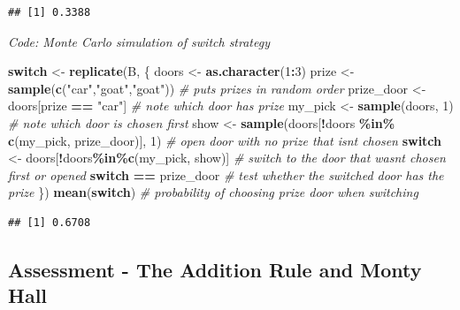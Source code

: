 \documentclass[
]{article}
\newenvironment{Shaded}{\begin{snugshade}}{\end{snugshade}}
\newcommand{\CommentTok}[1]{\textcolor[rgb]{0.56,0.35,0.01}{\textit{#1}}}
\newcommand{\ControlFlowTok}[1]{\textcolor[rgb]{0.13,0.29,0.53}{\textbf{#1}}}
\newcommand{\DecValTok}[1]{\textcolor[rgb]{0.00,0.00,0.81}{#1}}
\newcommand{\KeywordTok}[1]{\textcolor[rgb]{0.13,0.29,0.53}{\textbf{#1}}}
\newcommand{\NormalTok}[1]{#1}
\newcommand{\OperatorTok}[1]{\textcolor[rgb]{0.81,0.36,0.00}{\textbf{#1}}}
\newcommand{\StringTok}[1]{\textcolor[rgb]{0.31,0.60,0.02}{#1}}
\begin{document}
\begin{verbatim}
## [1] 0.3388
\end{verbatim}

\emph{Code: Monte Carlo simulation of switch strategy}

\begin{Shaded}
\begin{Highlighting}[]
\ControlFlowTok{switch}\NormalTok{ \textless{}{-}}\StringTok{ }\KeywordTok{replicate}\NormalTok{(B, \{}
\NormalTok{  doors \textless{}{-}}\StringTok{ }\KeywordTok{as.character}\NormalTok{(}\DecValTok{1}\OperatorTok{:}\DecValTok{3}\NormalTok{)}
\NormalTok{  prize \textless{}{-}}\StringTok{ }\KeywordTok{sample}\NormalTok{(}\KeywordTok{c}\NormalTok{(}\StringTok{"car"}\NormalTok{,}\StringTok{"goat"}\NormalTok{,}\StringTok{"goat"}\NormalTok{))    }\CommentTok{\# puts prizes in random order}
\NormalTok{  prize\_door \textless{}{-}}\StringTok{ }\NormalTok{doors[prize }\OperatorTok{==}\StringTok{ "car"}\NormalTok{]    }\CommentTok{\# note which door has prize}
\NormalTok{  my\_pick  \textless{}{-}}\StringTok{ }\KeywordTok{sample}\NormalTok{(doors, }\DecValTok{1}\NormalTok{)    }\CommentTok{\# note which door is chosen first}
\NormalTok{  show \textless{}{-}}\StringTok{ }\KeywordTok{sample}\NormalTok{(doors[}\OperatorTok{!}\NormalTok{doors }\OperatorTok{\%in\%}\StringTok{ }\KeywordTok{c}\NormalTok{(my\_pick, prize\_door)], }\DecValTok{1}\NormalTok{)    }\CommentTok{\# open door with no prize that isn\textquotesingle{}t chosen}
  \ControlFlowTok{switch}\NormalTok{ \textless{}{-}}\StringTok{ }\NormalTok{doors[}\OperatorTok{!}\NormalTok{doors}\OperatorTok{\%in\%}\KeywordTok{c}\NormalTok{(my\_pick, show)]    }\CommentTok{\# switch to the door that wasn\textquotesingle{}t chosen first or opened}
  \ControlFlowTok{switch} \OperatorTok{==}\StringTok{ }\NormalTok{prize\_door    }\CommentTok{\# test whether the switched door has the prize}
\NormalTok{\})}
\KeywordTok{mean}\NormalTok{(}\ControlFlowTok{switch}\NormalTok{)    }\CommentTok{\# probability of choosing prize door when switching}
\end{Highlighting}
\end{Shaded}

\begin{verbatim}
## [1] 0.6708
\end{verbatim}

\hypertarget{assessment---the-addition-rule-and-monty-hall}{%
\subsection{Assessment - The Addition Rule and Monty
Hall}\label{assessment---the-addition-rule-and-monty-hall}}
\end{document}
